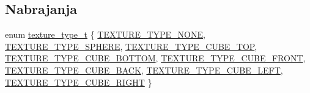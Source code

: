 \subsection*{Nabrajanja}
\begin{DoxyCompactItemize}
\item 
enum \hyperlink{namespacetinyobj_a5c9f207e1f880a48bac0a3b69f16d7f8}{texture\+\_\+type\+\_\+t} \{ \newline
\hyperlink{namespacetinyobj_a5c9f207e1f880a48bac0a3b69f16d7f8a259804f2e7bf9c39626abe6ebce6edc1}{T\+E\+X\+T\+U\+R\+E\+\_\+\+T\+Y\+P\+E\+\_\+\+N\+O\+NE}, 
\hyperlink{namespacetinyobj_a5c9f207e1f880a48bac0a3b69f16d7f8a4e5a6bfb8a95a23bf0cce576aaa5dfa4}{T\+E\+X\+T\+U\+R\+E\+\_\+\+T\+Y\+P\+E\+\_\+\+S\+P\+H\+E\+RE}, 
\hyperlink{namespacetinyobj_a5c9f207e1f880a48bac0a3b69f16d7f8acc4c4327df32dce3fa406865a8e35519}{T\+E\+X\+T\+U\+R\+E\+\_\+\+T\+Y\+P\+E\+\_\+\+C\+U\+B\+E\+\_\+\+T\+OP}, 
\hyperlink{namespacetinyobj_a5c9f207e1f880a48bac0a3b69f16d7f8a20c37be3992ed111ba47045a63351cde}{T\+E\+X\+T\+U\+R\+E\+\_\+\+T\+Y\+P\+E\+\_\+\+C\+U\+B\+E\+\_\+\+B\+O\+T\+T\+OM}, 
\newline
\hyperlink{namespacetinyobj_a5c9f207e1f880a48bac0a3b69f16d7f8a1ce5bed3c2ba5c360ca6c2607b9d97ca}{T\+E\+X\+T\+U\+R\+E\+\_\+\+T\+Y\+P\+E\+\_\+\+C\+U\+B\+E\+\_\+\+F\+R\+O\+NT}, 
\hyperlink{namespacetinyobj_a5c9f207e1f880a48bac0a3b69f16d7f8af2cb2d4e7551e713593382c4690aa665}{T\+E\+X\+T\+U\+R\+E\+\_\+\+T\+Y\+P\+E\+\_\+\+C\+U\+B\+E\+\_\+\+B\+A\+CK}, 
\hyperlink{namespacetinyobj_a5c9f207e1f880a48bac0a3b69f16d7f8a01f908bcfb745ad0d97d84b8cacc6d30}{T\+E\+X\+T\+U\+R\+E\+\_\+\+T\+Y\+P\+E\+\_\+\+C\+U\+B\+E\+\_\+\+L\+E\+FT}, 
\hyperlink{namespacetinyobj_a5c9f207e1f880a48bac0a3b69f16d7f8a7709b5986f04e87ffbdc9bd7280d261c}{T\+E\+X\+T\+U\+R\+E\+\_\+\+T\+Y\+P\+E\+\_\+\+C\+U\+B\+E\+\_\+\+R\+I\+G\+HT}
 \}
\end{DoxyCompactItemize}
